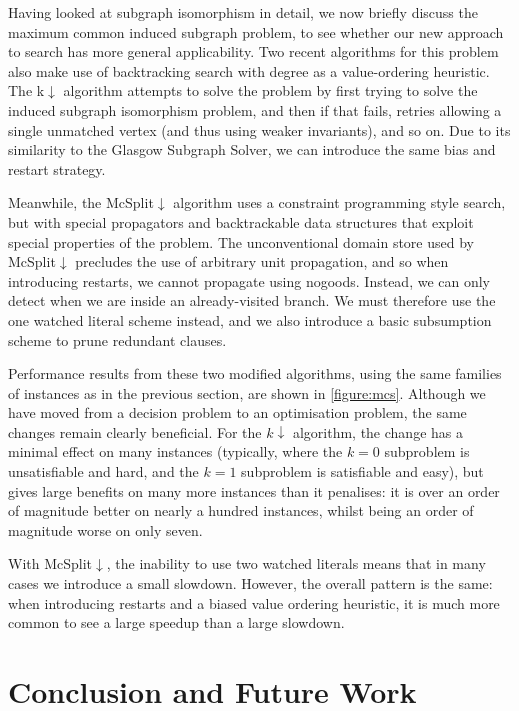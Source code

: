 \documentclass[runningheads]{llncs}
\begin{document}
Having looked at subgraph isomorphism in detail, we now briefly discuss the maximum common induced
subgraph problem, to see whether our new approach to search has more general applicability.  Two
recent algorithms for this problem also make use of backtracking search with degree as a
value-ordering heuristic. The k${\downarrow}$ algorithm \cite{DBLP:conf/aaai/HoffmannMR17} attempts
to solve the problem by first trying to solve the induced subgraph isomorphism problem, and then if
that fails, retries allowing a single unmatched vertex (and thus using weaker invariants), and so
on. Due to its similarity to the Glasgow Subgraph Solver, we can introduce the same bias and restart
strategy.

Meanwhile, the McSplit${\downarrow}$ algorithm
\cite{DBLP:conf/ijcai/McCreeshPT17} uses a constraint programming style search, but with special
propagators and backtrackable data structures that exploit special properties of the problem. The
unconventional domain store used by McSplit${\downarrow}$ precludes the use of arbitrary unit
propagation, and so when introducing restarts, we cannot propagate using nogoods.  Instead, we can
only detect when we are inside an already-visited branch.  We must therefore use the one watched
literal scheme instead, and we also introduce a basic subsumption scheme to prune redundant clauses.

Performance results from these two modified algorithms, using the same families of instances as in
the previous section, are shown in \cref{figure:mcs}. Although we have
moved from a decision problem to an optimisation problem, the same changes remain clearly
beneficial. For the $k{\downarrow}$ algorithm, the change has a minimal effect on many instances
(typically, where the $k = 0$ subproblem is unsatisfiable and hard, and the $k = 1$ subproblem is
satisfiable and easy), but gives large benefits on many more instances than it penalises: it is over
an order of magnitude better on nearly a hundred instances, whilst being an order of magnitude worse
on only seven.

With McSplit${\downarrow}$, the inability to use two watched literals means that in many cases we
introduce a small slowdown. However, the overall pattern is the same: when introducing restarts and
a biased value ordering heuristic, it is much more common to see a large speedup than a large
slowdown.

\section{Conclusion and Future Work}
\end{document}
